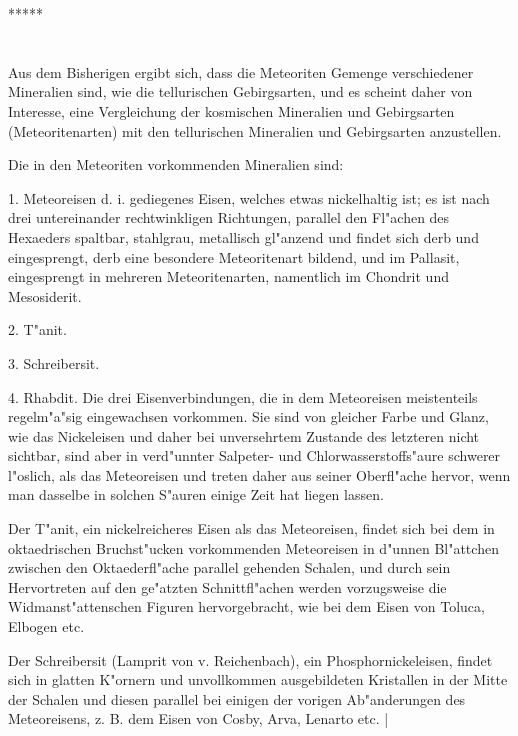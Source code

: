 \documentclass[a4paper, 11pt, oneside]{article}
\begin{document}
\centerline{*\hspace{15mm}*\hspace{15mm}*\hspace{15mm}*\hspace{15mm}*}
\clearpage
\section{}
\paragraph{}
Aus dem Bisherigen ergibt sich, dass die Meteoriten Gemenge verschiedener Mineralien sind, wie die tellurischen Gebirgsarten, und es scheint daher von Interesse, eine Vergleichung der kosmischen Mineralien und Gebirgsarten (Meteoritenarten) mit den tellurischen Mineralien und Gebirgsarten anzustellen.

Die in den Meteoriten vorkommenden Mineralien sind:

1. Meteoreisen d. i. gediegenes Eisen, welches etwas nickelhaltig ist; es ist nach drei untereinander rechtwinkligen Richtungen, parallel den Fl"achen des Hexaeders spaltbar, stahlgrau, metallisch gl"anzend und findet sich derb und eingesprengt, derb eine besondere Meteoritenart bildend, und im Pallasit, eingesprengt in mehreren Meteoritenarten, namentlich im Chondrit und Mesosiderit.

2. T"anit.

3. Schreibersit.

4. Rhabdit. Die drei Eisenverbindungen, die in dem Meteoreisen meistenteils regelm"a"sig eingewachsen vorkommen. Sie sind von gleicher Farbe und Glanz, wie das Nickeleisen und daher bei unversehrtem Zustande des letzteren nicht sichtbar, sind aber in verd"unnter Salpeter- und Chlorwasserstoffs"aure schwerer l"oslich, als das Meteoreisen und treten daher aus seiner Oberfl"ache hervor, wenn man dasselbe in solchen S"auren einige Zeit hat liegen lassen.

Der T"anit, ein nickelreicheres Eisen als das Meteoreisen, findet sich bei dem in oktaedrischen Bruchst"ucken vorkommenden Meteoreisen in d"unnen Bl"attchen zwischen den Oktaederfl"ache parallel gehenden Schalen, und durch sein Hervortreten auf den ge"atzten Schnittfl"achen werden vorzugsweise die Widmanst"attenschen Figuren hervorgebracht, wie bei dem Eisen von Toluca, Elbogen etc.

Der Schreibersit (Lamprit von v. Reichenbach), ein Phosphornickeleisen, findet sich in glatten K"ornern und unvollkommen ausgebildeten Kristallen in der Mitte der Schalen und diesen parallel bei einigen der vorigen Ab"anderungen des Meteoreisens, z. B. dem Eisen von Cosby, Arva, Lenarto etc. |
\end{document}
